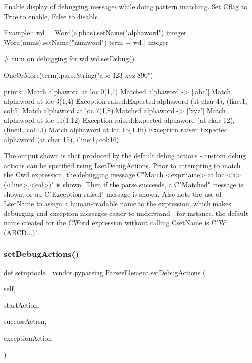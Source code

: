 \begin{DoxyVerb}Enable display of debugging messages while doing pattern matching.
Set C{flag} to True to enable, False to disable.

Example::
    wd = Word(alphas).setName("alphaword")
    integer = Word(nums).setName("numword")
    term = wd | integer
    
    # turn on debugging for wd
    wd.setDebug()

    OneOrMore(term).parseString("abc 123 xyz 890")

prints::
    Match alphaword at loc 0(1,1)
    Matched alphaword -> ['abc']
    Match alphaword at loc 3(1,4)
    Exception raised:Expected alphaword (at char 4), (line:1, col:5)
    Match alphaword at loc 7(1,8)
    Matched alphaword -> ['xyz']
    Match alphaword at loc 11(1,12)
    Exception raised:Expected alphaword (at char 12), (line:1, col:13)
    Match alphaword at loc 15(1,16)
    Exception raised:Expected alphaword (at char 15), (line:1, col:16)

The output shown is that produced by the default debug actions - custom debug actions can be
specified using L{setDebugActions}. Prior to attempting
to match the C{wd} expression, the debugging message C{"Match <exprname> at loc <n>(<line>,<col>)"}
is shown. Then if the parse succeeds, a C{"Matched"} message is shown, or an C{"Exception raised"}
message is shown. Also note the use of L{setName} to assign a human-readable name to the expression,
which makes debugging and exception messages easier to understand - for instance, the default
name created for the C{Word} expression without calling C{setName} is C{"W:(ABCD...)"}.
\end{DoxyVerb}
 \mbox{\label{classsetuptools_1_1__vendor_1_1pyparsing_1_1ParserElement_ad451f13e3d97e07edc726f65fecc37a8}} 
\subsubsection{\texorpdfstring{set\+Debug\+Actions()}{setDebugActions()}}
{\footnotesize\ttfamily def setuptools.\+\_\+vendor.\+pyparsing.\+Parser\+Element.\+set\+Debug\+Actions (\begin{DoxyParamCaption}\item[{}]{self,  }\item[{}]{start\+Action,  }\item[{}]{success\+Action,  }\item[{}]{exception\+Action }\end{DoxyParamCaption})}

